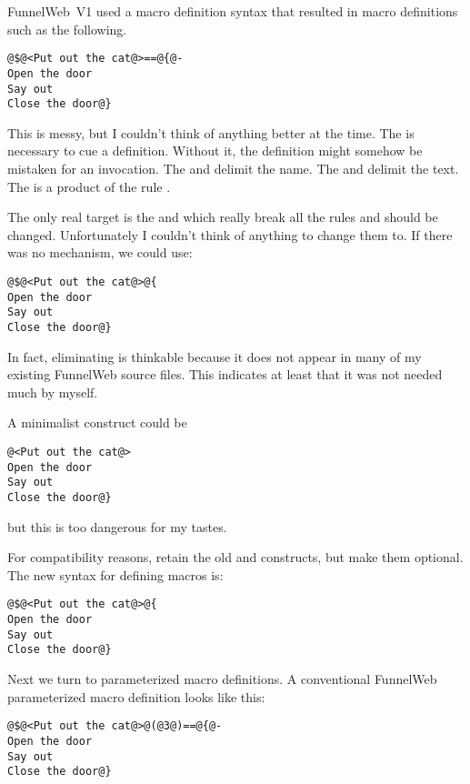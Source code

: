 FunnelWeb~V1 used a macro definition syntax that resulted in macro
definitions such as the following.

\begin{verbatim}
@$@<Put out the cat@>==@{@-
Open the door
Say out
Close the door@}
\end{verbatim}

This is messy, but I couldn't think of anything better at the time.
The  is necessary to cue a definition. Without it, the definition
might somehow be mistaken for an invocation.
The  and  delimit the name.
The  and  delimit the text.
The  is a product of the rule
.

The only real target is the \dqp{+=} and \dqp{==} which really break all
the rules
and should be changed. Unfortunately I couldn't
think of anything to change them
to. If there was no \p{+=} mechanism, we could use:

\begin{verbatim}
@$@<Put out the cat@>@{
Open the door
Say out
Close the door@}
\end{verbatim}

In fact, eliminating \p{+=} is thinkable because it does not appear in
many of my existing FunnelWeb source files. This indicates at least that
it was not needed much by myself.

A minimalist construct could be

\begin{verbatim}
@<Put out the cat@>
Open the door
Say out
Close the door@}
\end{verbatim}

but this is too dangerous for my tastes.

 For compatibility reasons,
retain the old \p{+=} and \p{==} constructs, but make them optional.
The new syntax for defining macros is:

\begin{verbatim}
@$@<Put out the cat@>@{
Open the door
Say out
Close the door@}
\end{verbatim}

Next we turn to parameterized macro
definitions.
A conventional FunnelWeb parameterized macro definition looks like this:

\begin{verbatim}
@$@<Put out the cat@>@(@3@)==@{@-
Open the door
Say out
Close the door@}
\end{verbatim}

